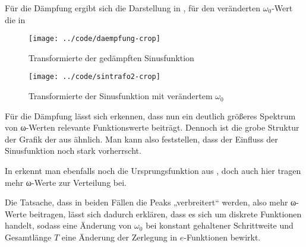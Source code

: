 

Für die Dämpfung ergibt sich die Darstellung in , für den
veränderten $ω_0$-Wert die in 

\begin{figure}[htb]
\centering
  \texttt{[image: ../code/daempfung-crop]}
  \caption{Transformierte der gedämpften Sinusfunktion}
  \label{fig:daempfung}
\end{figure}

\begin{figure}[htb]
\centering
  \texttt{[image: ../code/sintrafo2-crop]}
  \caption{Transformierte der Sinusfunktion mit verändertem $ω_0$}
  \label{fig:w0}
\end{figure}

Für die Dämpfung lässt sich erkennen, dass nun ein deutlich größeres Spektrum
von ω-Werten relevante Funktionswerte beiträgt. Dennoch ist die grobe Struktur der Grafik 
der aus  ähnlich. Man kann also feststellen, dass der Einfluss der
Sinusfunktion noch stark vorherrscht.

In  erkennt man ebenfalls noch die Ursprungsfunktion aus ,
doch auch hier tragen mehr ω-Werte zur Verteilung bei. 

Die Tatsache, dass in beiden Fällen die Peaks „verbreitert“ werden, also mehr 
ω-Werte beitragen, lässt sich dadurch erklären, dass es sich um diskrete
Funktionen handelt, sodass eine Änderung von $ω_0$ bei konstant gehaltener 
Schrittweite und Gesamtlänge $T$ eine Änderung der Zerlegung in $e$-Funktionen
bewirkt.